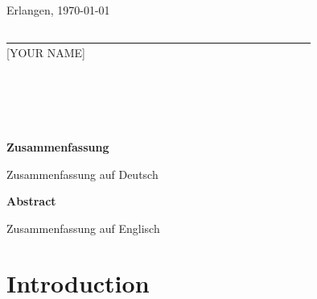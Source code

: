 \documentclass[10pt,twoside,a4paper,bibliography=totoc]{scrbook}
\makeatletter
\def\cleardoublepage{\clearpage\if@twoside \ifodd\c@page\else
  \hbox{}
  \thispagestyle{plain}
  \newpage
  \if@twocolumn\hbox{}\newpage\fi\fi\fi}
\makeatother
\begin{document}
\vspace{2em}

Erlangen, \today
\begin{flushright}
	\underline{\ \ \ \ \ \ \ \ \ \ \ \ \ \ \ \ \ \ \ \ \ \ \ \ \ 
		\ \ \ \ \ \ \ \ \ \ \ \ \ \ \ \ \ \ \ \ \ \ \ \ \ \ \ \ \ 
	} \\
	\small{[YOUR NAME]}
\end{flushright}

%
% 

\chapter*{\ }


\begin{center}
	\begin{large}
		\textbf{Zusammenfassung}
	\end{large}
\end{center}
\vspace{0.75em}

Zusammenfassung auf Deutsch \blindtext

\vspace{2em}
\begin{center}
	\begin{large}
		\textbf{Abstract}
	\end{large}
\end{center}
\vspace{0.75em}

Zusammenfassung auf Englisch \blindtext{}



 \listoftables
 \listoffigures
\begin{onehalfspacing}
\tableofcontents
\end{onehalfspacing}
\cleardoublepage



\fancyhead[RE]{\leftmark}
%
% 


\chapter{Introduction}
\end{document}
